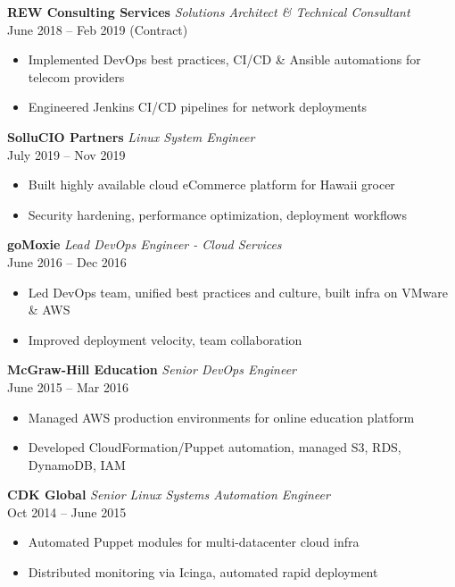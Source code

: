 \documentclass[11pt,a4paper]{article}
\begin{document}
\textbf{REW Consulting Services} \hfill \emph{Solutions Architect \& Technical Consultant}\\
June 2018 -- Feb 2019 (Contract)\\
\begin{itemize}[leftmargin=1.2em]
    \item Implemented DevOps best practices, CI/CD \& Ansible automations for telecom providers
    \item Engineered Jenkins CI/CD pipelines for network deployments
\end{itemize}

\textbf{SolluCIO Partners} \hfill \emph{Linux System Engineer}\\
July 2019 -- Nov 2019\\
\begin{itemize}[leftmargin=1.2em]
    \item Built highly available cloud eCommerce platform for Hawaii grocer
    \item Security hardening, performance optimization, deployment workflows
\end{itemize}

\textbf{goMoxie} \hfill \emph{Lead DevOps Engineer - Cloud Services}\\
June 2016 -- Dec 2016\\
\begin{itemize}[leftmargin=1.2em]
    \item Led DevOps team, unified best practices and culture, built infra on VMware \& AWS
    \item Improved deployment velocity, team collaboration
\end{itemize}

\textbf{McGraw-Hill Education} \hfill \emph{Senior DevOps Engineer}\\
June 2015 -- Mar 2016\\
\begin{itemize}[leftmargin=1.2em]
    \item Managed AWS production environments for online education platform
    \item Developed CloudFormation/Puppet automation, managed S3, RDS, DynamoDB, IAM
\end{itemize}

\textbf{CDK Global} \hfill \emph{Senior Linux Systems Automation Engineer}\\
Oct 2014 -- June 2015\\
\begin{itemize}[leftmargin=1.2em]
    \item Automated Puppet modules for multi-datacenter cloud infra
    \item Distributed monitoring via Icinga, automated rapid deployment
\end{itemize}
\end{document}

